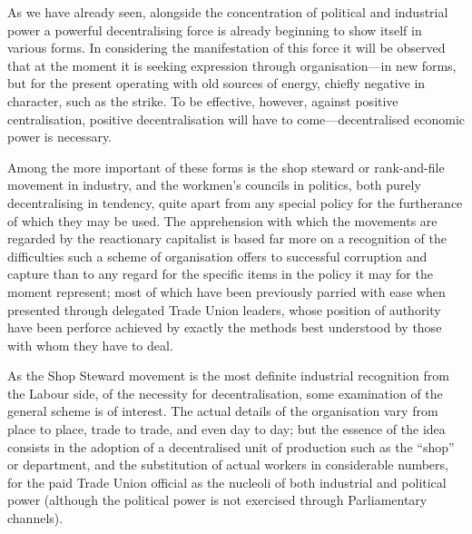 \documentclass{book}
\begin{document}
As we have already seen, alongside the concentration of political and industrial power a powerful decentralising force is already beginning to show itself in various forms. In considering the manifestation of this force it will be observed that at the moment it is seeking expression through organisation—in new forms, but for the present operating with old sources of energy, chiefly negative in character, such as the strike. To be effective, however, against positive centralisation, positive decentralisation will have to come—decentralised economic power is necessary.

Among the more important of these forms is the shop steward or rank-and-file movement in industry, and the workmen’s councils in politics, both purely decentralising in tendency, quite apart from any special policy for the furtherance of which they may be used. The apprehension with which the movements are regarded by the reactionary capitalist is based far more on a recognition of the difficulties such a scheme of organisation offers to successful corruption and capture than to any regard for the specific items in the policy it may for the moment represent; most of which have been previously parried with ease when presented through delegated Trade Union leaders, whose position of authority have been perforce achieved by exactly the methods best understood by those with whom they have to deal.

As the Shop Steward movement is the most definite industrial recognition from the Labour side, of the necessity for decentralisation, some examination of the general scheme is of interest. The actual details of the organisation vary from place to place, trade to trade, and even day to day; but the essence of the idea consists in the adoption of a decentralised unit of production such as the “shop” or department, and the substitution of actual workers in considerable numbers, for the paid Trade Union official as the nucleoli of both industrial and political power (although the political power is not exercised through Parliamentary channels).
\end{document}
